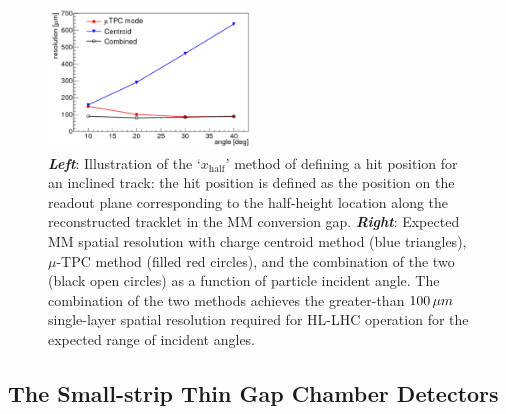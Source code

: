 \begin{figure}[!htb]
    \begin{center}
        \includegraphics[width=0.48\textwidth]{figures/nsw/tpc_vs_centroid_res}
        \caption{
            \textbf{\textit{Left}}: Illustration of the `$x_{\text{half}}$' method of defining a hit position for
                an inclined track: the hit position is defined as the position on the readout plane
                corresponding to the half-height location along the reconstructed tracklet in the MM conversion gap.
            \textbf{\textit{Right}}: Expected MM spatial resolution with charge centroid method (blue triangles), $\mu$-TPC
                method (filled red circles), and the combination of the two (black open circles) as a function
                of particle incident angle.
                The combination of the two methods achieves the greater-than $100\,\mu m$ single-layer spatial resolution
                required for HL-LHC operation for the expected range of incident angles.
        }
        \label{fig:mm_tpc_hit_loc}
    \end{center}
\end{figure}

\subsection{The Small-strip Thin Gap Chamber Detectors}
\label{sec:nsw_stgc}


